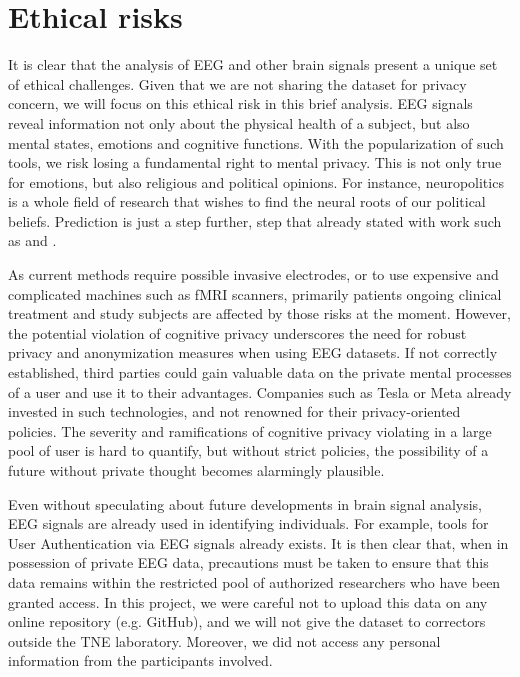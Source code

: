 \documentclass[10pt,conference,compsocconf]{IEEEtran}
\begin{document}
\section{Ethical risks}
It is clear that the analysis of EEG and other brain signals present a unique set of ethical challenges. Given that we are not sharing the dataset for privacy concern, we will focus on this ethical risk in this brief analysis. EEG signals reveal information not only about the physical health of a subject, but also mental states, emotions and cognitive functions. With the popularization of such tools, we risk losing a fundamental right to mental privacy. This is not only true for emotions, but also religious and political opinions. For instance, neuropolitics\cite{neuropolitics} is a whole field of research that wishes to find the neural roots of our political beliefs. Prediction is just a step further, step that already stated with work such as \cite{galli_early_2021} and \cite{yun_erp_2022}.

As current methods require possible invasive electrodes, or to use expensive and complicated machines such as fMRI scanners, primarily patients ongoing clinical treatment and study subjects are affected by those risks at the moment. However, the potential violation of cognitive privacy underscores the need for robust privacy and anonymization measures when using EEG datasets. If not correctly established, third parties could gain valuable data on the private mental processes of a user and use it to their advantages. Companies such as Tesla or Meta already invested in such technologies, and not renowned for their privacy-oriented policies. The severity and ramifications of cognitive privacy violating in a large pool of user is hard to quantify, but without strict policies, the possibility of a future without private thought becomes alarmingly plausible.

Even without speculating about future developments in brain signal analysis, EEG signals are already used in identifying individuals. For example, tools for User Authentication via EEG signals already exists\cite{10058960}. It is then clear that, when in possession of private EEG data, precautions must be taken to ensure that this data remains within the restricted pool of authorized researchers who have been granted access. In this project, we were careful not to upload this data on any online repository (e.g. GitHub), and we will not give the dataset to correctors outside the TNE laboratory. Moreover, we did not access any personal information from the participants involved.
\end{document}
